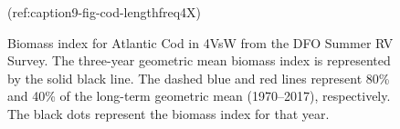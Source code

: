 \documentclass[11pt]{book}
\begin{document}
\begin{figure}[htb]

{\centering {} 

}

\caption{(ref:caption9-fig-cod-lengthfreq4X)}\label{fig:9-fig-cod-lengthfreq4X}
\end{figure}

\begin{figure}[htb]

{\centering {} 

}

\caption{Biomass index for Atlantic Cod in 4VsW from the DFO Summer RV Survey. The three-year geometric mean biomass index is represented by the solid black line. The dashed blue and red lines represent 80\% and 40\% of the long-term geometric mean (1970--2017), respectively. The black dots represent the biomass index for that year.}\label{fig:10-fig-cod-biomass4VsW}
\end{figure}
\end{document}

